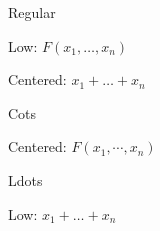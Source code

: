 \documentclass{sample}
\begin{document}
\begin{center}Regular\end{center}

Low: $F(x_1, \dots, x_n)$

Centered: $x_1 + \dots + x_n$

\begin{center}Cots\end{center}

Centered: $F(x_1, \cdots, x_n)$

\begin{center}Ldots\end{center}

Low: $x_1 + \ldots + x_n$
\end{document}
